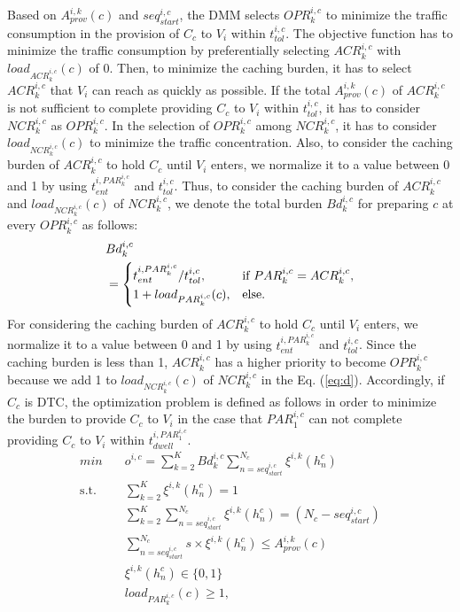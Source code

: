 \documentclass{ieeeaccess}
\begin{document}
Based on $A_{prov}^{i, k}(c)$ and $seq_{start}^{i,c}$, the DMM selects $OPR^{i,c}_{k}$ to minimize the traffic consumption in the provision of $C_{c}$ to $V_{i}$ within $t_{tol}^{i,c}$.
The objective function has to minimize the traffic consumption by preferentially selecting $ACR^{i,c}_{k}$ with $load_{ACR^{i,c}_{k}}(c)$ of 0.
Then, to minimize the caching burden, it has to select $ACR^{i,c}_{k}$ that $V_{i}$ can reach as quickly as possible.
If the total $A_{prov}^{i, k}(c)$ of $ACR^{i,c}_{k}$ is not sufficient to complete providing $C_{c}$ to $V_{i}$ within $t_{tol}^{i,c}$, it has to consider $NCR^{i,c}_{k}$ as $OPR^{i,c}_{k}$.
In the selection of $OPR^{i,c}_{k}$ among $NCR^{i,c}_{k}$, it has to consider $load_{NCR^{i,c}_{k}}(c)$ to minimize the traffic concentration.
Also, to consider the caching burden of $ACR^{i,c}_{k}$ to hold $C_{c}$ until $V_{i}$ enters, we normalize it to a value between 0 and 1 by using $t_{ent}^{i, PAR^{i,c}_{k}}$ and $t^{i,c}_{tol}$.
Thus, to consider the caching burden of $ACR^{i,c}_{k}$ and $load_{NCR^{i,c}_{k}}(c)$ of $NCR^{i,c}_{k}$, we denote the total burden $Bd^{i,c}_{k}$ for preparing $c$ at every $OPR^{i,c}_{k}$ as follows:
\begin{equation}
    \begin{split}
        &Bd^{i,c}_{k}\\ &= \begin{cases*}
            t_{ent}^{i, PAR^{i,c}_{k}}/t^{i,c}_{tol}, & if $PAR^{i,c}_{k}=ACR^{i,c}_{k}$,\\
            1 + load_{PAR^{i,c}_{k}}(c), & else.\\
        \end{cases*} 
    \end{split}\label{eq:d}
\end{equation}
For considering the caching burden of $ACR^{i,c}_{k}$ to hold $C_{c}$ until $V_{i}$ enters, we normalize it to a value between 0 and 1 by using $t_{ent}^{i, PAR^{i,c}_{k}}$ and $t^{i,c}_{tol}$.
Since the caching burden is less than 1, $ACR^{i,c}_{k}$ has a higher priority to become $OPR^{i,c}_{k}$ because we add 1 to $load_{NCR^{i,c}_{k}}(c)$ of $NCR^{i,c}_{k}$ in the Eq. (\ref{eq:d}).
Accordingly, if $C_{c}$ is DTC, the optimization problem is defined as follows in order to minimize the burden to provide $C_{c}$ to $V_{i}$ in the case that $PAR^{i,c}_{1}$ can not complete providing $C_{c}$ to $V_{i}$ within $t_{dwell}^{i,PAR^{i,c}_{1}}$.
\begin{align}
    min\quad &  o^{i,c} = \sum_{k=2}^{K}Bd^{i,c}_{k}\sum_{n=seq_{start}^{i,c}}^{N_{c}} \xi^{i,k}(h_{n}^{c})\\
    \text{s.t.} \quad & \sum_{k=2}^{K} \xi^{i, k}(h_{n}^{c}) = 1 \\
    & \sum_{k=2}^{K}\sum_{n=seq_{start}^{i,c}}^{N_{c}} \xi^{i, k}(h_{n}^{c}) = (N_{c}-seq_{start}^{i,c})\\
    & \sum_{n=seq_{start}^{i,c}}^{N_{c}} s\times\xi^{i, k}(h_{n}^{c}) \leq A_{prov}^{i, k}(c)\\
    & \xi^{i,k}(h_{n}^{c}) \in \{0, 1\} \\
    & load_{PAR^{i,c}_{k}}(c)\geq 1,
\end{align}
\end{document}
